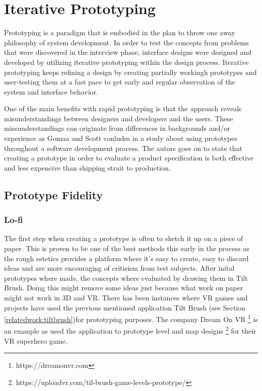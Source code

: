 \section{Iterative Prototyping}
Prototyping is a paradigm that is embodied in the plan to throw one
away philosophy of system development. \cite{proto:Gomaa1981}
In order to test the concepts from problems that were discovered in the interview phase, interface designs were designed and developed by utilizing iterative prototyping within the design process. Iterative prototyping keeps refining a design by creating partially workingh prototypes and user-testing them at a fast pace to get early and regular observation of the system and interface behavior.\cite{proto:hartson2012ux}

One of the main benefits with rapid prototyping is that the approach reveals misunderstandings between designers and developers and the  users. These missunderstandings can originate from differences in backgrounds and/or experience as Gomaa and Scott conludes in a study about using prototypes throughout a software development process.\cite{proto:Lichter1993} The autors goes on to state that creating a prototype in order to evaluate a product specification is both effective and less expencive than shipping strait to production.

\subsection{Prototype Fidelity}
\subsubsection{Lo-fi}
The first step when creating a prototype is often to sketch it up on a piece of paper. This is proven to be one of the best methods this early in the process as the rough estetics provides a platform where it's easy to create, easy to discard ideas and are more encouraging of critisism from test subjects. \cite{proto:boling1997holistic} After inital prototypes where made, the concepts where evaluated by drawing them in Tilt Brush. Doing this might remove some ideas just because what work on paper might not work in 3D and VR. There has been instances where VR games and projects have used the previous mentioned application Tilt Brush (see Section \ref{relatedwork:tiltbrush})for prototyping purposes. The company Dream On VR \footnote{https://dreamonvr.com} is an example as used the application to prototype level and map designs \footnote{https://uploadvr.com/til-brush-game-levels-prototype/} for their VR superhero game.

